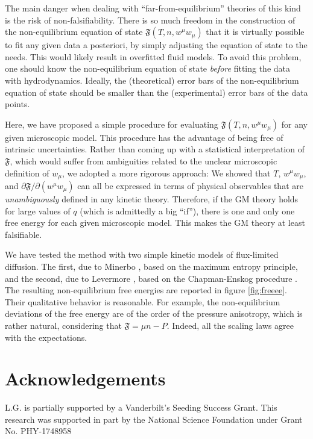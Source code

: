 \documentclass[a4paper, amsfonts, amssymb, amsmath, reprint, showkeys, nofootinbib, twoside, onecolumn, notitlepage]{revtex4-1}
\newcommand{\F}{{\mathfrak{F}}}
\begin{document}
The main danger when dealing with ``far-from-equilibrium'' theories of this kind is the risk of non-falsifiability. There is so much freedom in the construction of the non-equilibrium equation of state $\F(T,n,w^\mu w_\mu)$ that it is virtually possible to fit any given data a posteriori, by simply adjusting the equation of state to the needs. This would likely result in overfitted fluid models. To avoid this problem, one should know the non-equilibrium equation of state \textit{before} fitting the data with hydrodynamics. Ideally, the (theoretical) error bars of the non-equilibrium equation of state should be smaller than the (experimental) error bars of the data points.

Here, we have proposed a simple procedure for evaluating $\F(T,n,w^\mu w_\mu)$ for any given microscopic model. This procedure has the advantage of being free of intrinsic uncertainties. Rather than coming up with a statistical interpretation of $\F$, which would suffer from ambiguities related to the unclear microscopic definition of $w_\mu$, we adopted a more rigorous approach: We showed that $T$, $w^\mu w_\mu$, and $\partial \F/\partial (w^\mu w_\mu)$ can all be expressed in terms of physical observables that are \textit{unambiguously} defined in any kinetic theory. Therefore, if the GM theory holds for large values of $q$ (which is admittedly a big ``if''), there is one and only one free energy for each given microscopic model. This makes the GM theory at least falsifiable.

We have tested the method with two simple kinetic models of flux-limited diffusion. The first, due to Minerbo \cite{MINERBO1978}, based on the maximum entropy principle, and the second, due to Levermore \cite{Levermore1979,Levermore1981}, based on the Chapman-Enskog procedure \cite{ChapmanCowling}. The resulting non-equilibrium free energies are reported in figure \ref{fig:freeee}. Their qualitative behavior is reasonable. For example, the non-equilibrium deviations of the free energy are of the order of the pressure anisotropy, which is rather natural, considering that $\F=\mu n-P$. Indeed, all the scaling laws agree with the expectations.




\section*{Acknowledgements}

L.G. is partially supported by a Vanderbilt's Seeding Success Grant. This research was supported in part by the National Science Foundation under Grant No. PHY-1748958
\end{document}
